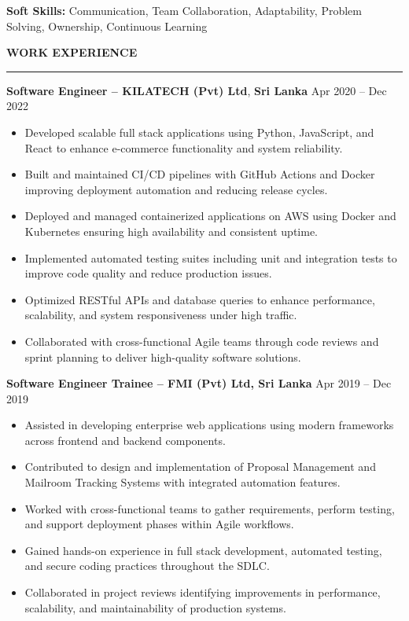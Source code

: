 \documentclass[10pt,letterpaper]{article}
\begin{document}
\textbf{Soft Skills:} Communication, Team Collaboration, Adaptability, Problem Solving, Ownership, Continuous Learning

\vspace{8pt}

\textbf{WORK EXPERIENCE}\\[-8pt]
\noindent\rule{\textwidth}{1pt}

\vspace{-2pt}

\textbf{Software Engineer -- KILATECH (Pvt) Ltd}, \textbf{Sri Lanka} \hfill Apr 2020 -- Dec 2022

\vspace{-1pt}

\begin{itemize}
\item Developed scalable full stack applications using Python, JavaScript, and React to enhance e-commerce functionality and system reliability.
\item Built and maintained CI/CD pipelines with GitHub Actions and Docker improving deployment automation and reducing release cycles.
\item Deployed and managed containerized applications on AWS using Docker and Kubernetes ensuring high availability and consistent uptime.
\item Implemented automated testing suites including unit and integration tests to improve code quality and reduce production issues.
\item Optimized RESTful APIs and database queries to enhance performance, scalability, and system responsiveness under high traffic.
\item Collaborated with cross-functional Agile teams through code reviews and sprint planning to deliver high-quality software solutions.
\end{itemize}

\textbf{Software Engineer Trainee -- FMI (Pvt) Ltd, Sri Lanka} \hfill Apr 2019 -- Dec 2019

\vspace{-1pt}

\begin{itemize}
\item Assisted in developing enterprise web applications using modern frameworks across frontend and backend components.
\item Contributed to design and implementation of Proposal Management and Mailroom Tracking Systems with integrated automation features.
\item Worked with cross-functional teams to gather requirements, perform testing, and support deployment phases within Agile workflows.
\item Gained hands-on experience in full stack development, automated testing, and secure coding practices throughout the SDLC.
\item Collaborated in project reviews identifying improvements in performance, scalability, and maintainability of production systems.
\end{itemize}
\end{document}
